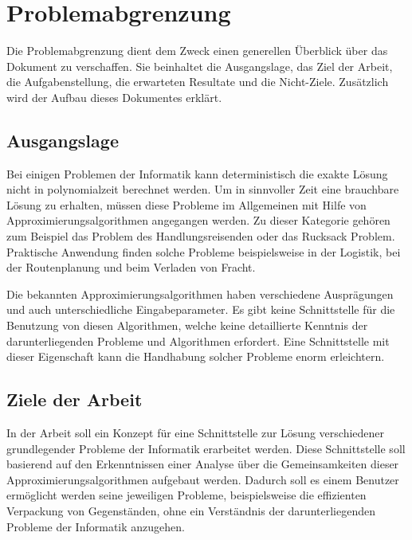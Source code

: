 %
%

\chapter{Problemabgrenzung}\label{chap.projektuebersicht}
Die Problemabgrenzung dient dem Zweck einen generellen Überblick über das Dokument zu verschaffen. Sie beinhaltet die Ausgangslage, das Ziel der Arbeit, die Aufgabenstellung, die erwarteten 
Resultate und die Nicht-Ziele. Zusätzlich wird der Aufbau dieses Dokumentes erklärt.

\section{Ausgangslage}\label{ausganglage}
Bei einigen Problemen der Informatik kann deterministisch die exakte Lösung nicht in \gls{polynomialzeit} berechnet werden. Um in sinnvoller Zeit eine brauchbare Lösung zu erhalten, müssen diese 
Probleme im Allgemeinen mit Hilfe von Approximierungsalgorithmen angegangen werden. Zu dieser Kategorie gehören zum Beispiel das Problem des Handlungsreisenden oder das Rucksack 
Problem. Praktische Anwendung finden solche Probleme beispielsweise in der Logistik, bei der Routenplanung und beim Verladen von Fracht.

Die bekannten Approximierungsalgorithmen haben verschiedene Ausprägungen und auch unterschiedliche Eingabeparameter. Es gibt keine Schnittstelle für die Benutzung von diesen 
Algorithmen, welche keine detaillierte Kenntnis der darunterliegenden Probleme und Algorithmen erfordert. Eine Schnittstelle mit dieser Eigenschaft kann die Handhabung solcher Probleme 
enorm erleichtern.

\section{Ziele der Arbeit}\label{ziele}
In der Arbeit soll ein Konzept für eine Schnittstelle zur Lösung verschiedener grundlegender Probleme der Informatik erarbeitet werden. Diese Schnittstelle soll basierend auf den Erkenntnissen 
einer Analyse über die Gemeinsamkeiten dieser Approximierungsalgorithmen aufgebaut werden. Dadurch soll es einem Benutzer ermöglicht werden seine jeweiligen Probleme, beispielsweise die 
effizienten Verpackung von Gegenständen, ohne ein Verständnis der darunterliegenden Probleme der Informatik anzugehen.

